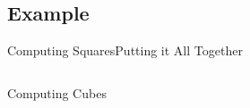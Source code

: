 \subsection{Example}

\begin{frame}{Computing Squares}{Putting it All Together}
    \inputminted{c++}{../code/square/square.cpp}
\end{frame}

\begin{frame}{Computing Cubes}{}
    \inputminted{c++}{../code/cube/cube.cpp}
\end{frame}

